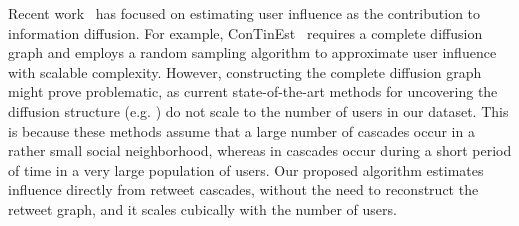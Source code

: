 Recent work~\cite{ICWSM1613006,Chikhaoui:2017:DCA:3127339.3070658} has focused on estimating user influence as the contribution to information diffusion. 
For example, ConTinEst~\cite{Du2013} requires a complete diffusion graph and employs a random sampling algorithm to approximate user influence with scalable complexity.
However, constructing the complete diffusion graph might prove problematic, as current state-of-the-art methods for uncovering the diffusion structure (e.g. \cite{Gomez-Rodriguez2011,simma2012modeling,cho2013latent,li2013dyadic,linderman2014discovering}) do not scale to the number of users in our dataset. 
This is because these methods assume that a large number of cascades occur in a rather small social neighborhood, whereas in \debate cascades occur during a short period of time in a very large population of users.
Our proposed algorithm estimates influence directly from retweet cascades, without the need to reconstruct the retweet graph, and it scales cubically with the number of users.



